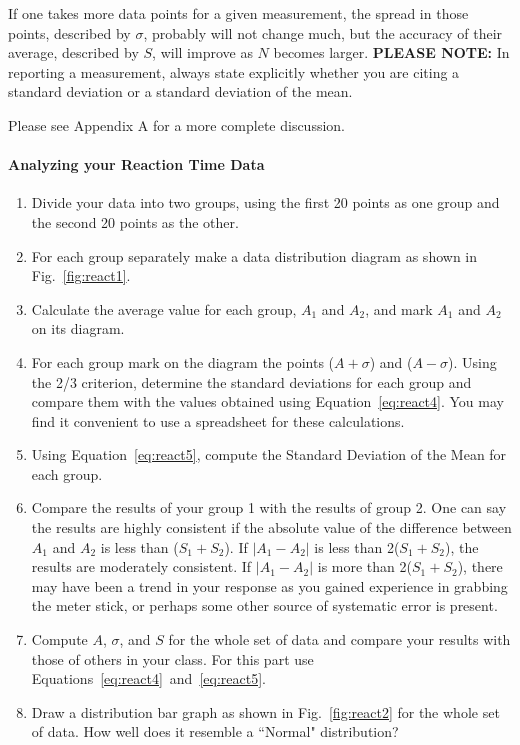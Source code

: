      If one takes more data points for a given measurement, the
spread in those points, described by $\sigma$,  probably will not
change much, but the accuracy of their average, described by $S$,
will improve as $N$ becomes larger.  {\bf PLEASE NOTE:}  In reporting a
measurement, always state explicitly whether you are citing a
standard deviation or a standard deviation of the mean.

Please see Appendix A for a more complete discussion.

\paragraph*{Analyzing your Reaction Time Data}

\begin{enumerate}
\item Divide your data into two groups, using the first 20 points as
   one group and the second 20 points as the other.
\item For each group separately make a data distribution diagram as
   shown in Fig.~\ref{fig:react1}.
\item Calculate the average value for each group, $A_{1}$ and $A_{2}$, and
   mark $A_{1}$ and $A_{2}$ on its diagram.
\item For each group mark on the diagram the points ($A + \sigma$) and
 ($A - \sigma$).
   Using the 2/3 criterion, determine the standard  deviations for
   each group and compare them with the values obtained using
   Equation~\ref{eq:react4}.  You may find it convenient to use
   a spreadsheet for these calculations.
%
\item Using Equation~\ref{eq:react5}, compute the Standard Deviation of the Mean
for each group.
\item Compare the results of your group 1 with the results of group 2.
   One can say the results are highly consistent if the absolute value of the
   difference
   between $A_{1}$ and $A_{2}$ is less than ($S_{1} + S_{2}$).
If $|A_{1} - A_{2}|$ is
   less than 2($S_{1} + S_{2}$), the results are moderately consistent.
   If $|A_{1} - A_{2}|$ is more than 2($S_{1} + S_{2}$), there may have been a
   trend in your response as you gained experience in grabbing the
   meter stick, or perhaps some other source of systematic error is present.
\item Compute $A$, $\sigma$, and $S$ for the whole set of data and compare your
    results with those of others in your class.  For this part use
    Equations~\ref{eq:react4}~and~\ref{eq:react5}.
%
\item Draw a distribution bar graph as shown in Fig.~\ref{fig:react2} for the
    whole set of data.  How well does it resemble a ``Normal" distribution?
\end{enumerate}

